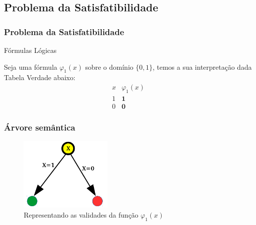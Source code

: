 \documentclass{beamer}
\begin{document}
\subsection{Problema da Satisfatibilidade}

\begin{frame}
\frametitle{Problema da Satisfatibilidade}

\begin{block}{Fórmulas Lógicas}

Seja uma fórmula $\varphi_1 (x)$ sobre  o domínio $\{0 , 1\}$,
temos a sua interpretação dada Tabela Verdade abaixo:
$$
\begin{array}{c|c}
x & \varphi_1 (x)\\\hline
1 & \mathbf{1}\\
0 & \mathbf{0}
\end{array}
$$
\end{block}

\end{frame}


\begin{frame}
\frametitle{Árvore semântica}
\begin{figure}[ht!]
 \centering
 \includegraphics[width=0.4\textwidth , height=0.6\textheight]{figures/x_tree.pdf}
\caption{Representando as validades da função $\varphi_1 (x)$} 
\end{figure}

\end{frame}

\end{document}
